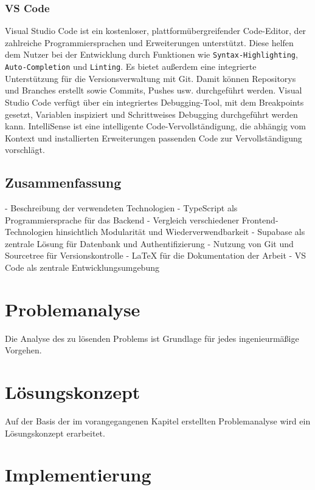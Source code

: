 \documentclass[oneside]{ausarbeitung}
\begin{document}
\subsection{VS Code}
Visual Studio Code ist ein kostenloser, plattformübergreifender Code-Editor, der zahlreiche Programmiersprachen und Erweiterungen unterstützt. Diese helfen dem Nutzer bei der Entwicklung durch Funktionen wie \texttt{Syntax-Highlighting}, \texttt{Auto-Completion} und \texttt{Linting}.
Es bietet außerdem eine integrierte Unterstützung für die Versionsverwaltung mit Git. Damit können Repositorys und Branches erstellt sowie Commits, Pushes usw. durchgeführt werden.
Visual Studio Code verfügt über ein integriertes Debugging-Tool, mit dem Breakpoints gesetzt, Variablen inspiziert und Schrittweises Debugging durchgeführt werden kann.
IntelliSense ist eine intelligente Code-Vervollständigung, die abhängig vom Kontext und installierten Erweiterungen passenden Code zur Vervollständigung vorschlägt.

\section{Zusammenfassung}
- Beschreibung der verwendeten Technologien  
- TypeScript als Programmiersprache für das Backend  
- Vergleich verschiedener Frontend-Technologien hinsichtlich Modularität und Wiederverwendbarkeit  
- Supabase als zentrale Lösung für Datenbank und Authentifizierung  
- Nutzung von Git und Sourcetree für Versionskontrolle  
- LaTeX für die Dokumentation der Arbeit  
- VS Code als zentrale Entwicklungsumgebung  



\chapter{Problemanalyse}
\label{cha:problemanalyse}

Die Analyse des zu lösenden Problems ist Grundlage für jedes ingenieurmäßige Vorgehen. 

\chapter{Lösungskonzept}
\label{cha:loesungskonzept}

Auf der Basis der im vorangegangenen Kapitel erstellten Problemanalyse wird ein Lösungskonzept erarbeitet.

\chapter{Implementierung}
\label{cha:implementierung}
\end{document}
